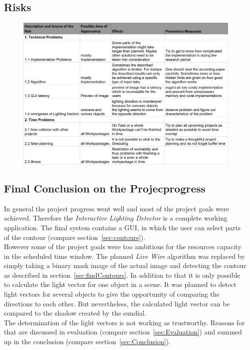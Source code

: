 \subsection{Risks} \label{sec:risks}
\begin{figure}[H] 
	\center 
	\includegraphics[scale = 0.7]{Images/risks.jpg}			
\end{figure}

\subsection{Final Conclusion on the Projecprogress} \label{sec:pmCon}
In general the project progress went well and most of the project goals were achieved. Therefore the \textit{Interactive Lighting Detector} is a complete working application. The final system contains a GUI, in which the user can select parts of the contour (compare section~\ref{sec:contours}). \\
However some of the project goals were too ambitious for the resources capacity in the scheduled time window. The planned \textit{Live Wire} algorithm was replaced by simply taking a binary mask image of the actual image and detecting the contour as described in section~\ref{sec:findContours}. In addition to that it is only possible to calculate the light vector for one object in a scene. It was planned to detect light vectors for several objects to give the opportunity of comparing the directions to each other. But nevertheless, the calculated light vector can be compared to the shadow created by the sundial. \\
The determination of the light vectors is not working as trustworthy. Reasons for that are discussed in evaluation (compare section~\ref{sec:Evaluation}) and summed up in the conclusion (compare section~\ref{sec:Conclusion}).



\newpage

























